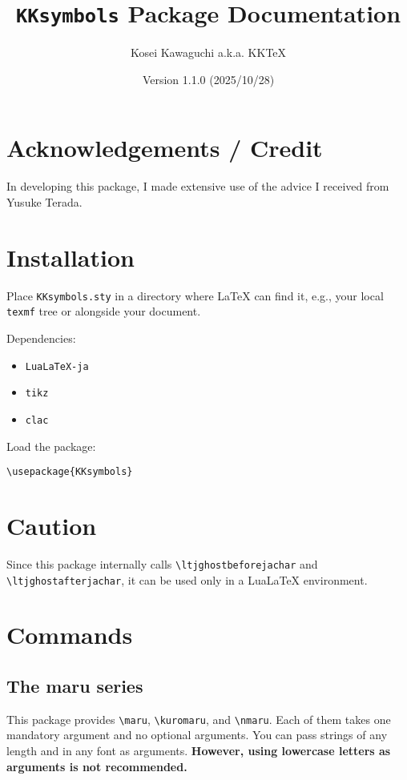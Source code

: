 \documentclass[luatex,fontsize=10pt,paper=b5,twoside]{jlreq}%
\title{\texttt{KKsymbols} Package Documentation}
\author{Kosei Kawaguchi a.k.a. KKTeX}
\date{Version 1.1.0 (2025/10/28)}
\begin{document}
\begin{titlepage}
  \maketitle
\end{titlepage}
\newpage
\tableofcontents
\newpage

\section{Acknowledgements / Credit}
In developing this package, I made extensive use of the advice I received from Yusuke Terada.

\section{Installation}
Place \texttt{KKsymbols.sty} in a directory where LaTeX can find it, e.g., your local \texttt{texmf} tree or alongside your document.

Dependencies:
\begin{itemize}
    \item \texttt{LuaLaTeX-ja}
    \item \texttt{tikz}
    \item \texttt{clac}
\end{itemize}

Load the package:

\begin{verbatim}
\usepackage{KKsymbols}
\end{verbatim}

\section{Caution}
Since this package internally calls \verb|\ltjghostbeforejachar| and \verb|\ltjghostafterjachar|, it can be used only in a LuaLaTeX environment.

\section{Commands}
\subsection{The maru series}
This package provides \verb|\maru|, \verb|\kuromaru|, and \verb|\nmaru|. Each of them takes one mandatory argument and no optional arguments. You can pass strings of any length and in any font as arguments. \textbf{However, using lowercase letters as arguments is not recommended.}
\end{document}
